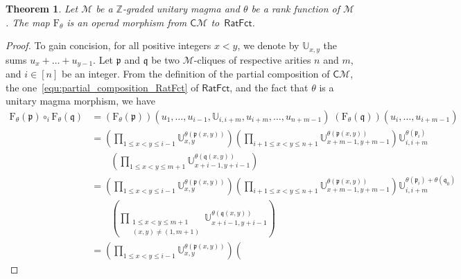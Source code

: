 \documentclass[10pt,reqno]{amsart}
\numberwithin{equation}{subsection}
\renewcommand{\leq}{\leqslant}
\newtheorem{Theorem}{Theorem}[subsection]
\newcommand{\Z}{\mathbb{Z}}
\newcommand{\Mca}{\mathcal{M}}
\newcommand{\Ubb}{\mathbb{U}}
\newcommand{\Pfr}{\mathfrak{p}}
\newcommand{\Qfr}{\mathfrak{q}}
\newcommand{\Cli}{\mathsf{C}}
\newcommand{\RatFct}{\mathsf{RatFct}}
\newcommand{\Frac}{\mathrm{F}}
\begin{document}
\begin{Theorem} \label{thm:rat_fct_cliques}
    Let $\Mca$ be a $\Z$-graded unitary magma and $\theta$ be a rank
    function of $\Mca$. The map $\Frac_\theta$ is an operad morphism
    from $\Cli\Mca$ to~$\RatFct$.
\end{Theorem}
\begin{proof}
    To gain concision, for all positive integers $x < y$, we denote
    by $\Ubb_{x, y}$ the sums $u_x + \dots + u_{y - 1}$. Let $\Pfr$
    and $\Qfr$ be two $\Mca$-cliques of respective arities $n$ and $m$,
    and $i \in [n]$ be an integer. From the definition of the partial
    composition of $\Cli\Mca$, the
    one~\eqref{equ:partial_composition_RatFct} of $\RatFct$, and the
    fact that $\theta$ is a unitary magma morphism, we have
    \begin{equation}\begin{split}
        \Frac_\theta(\Pfr) \circ_i \Frac_\theta(\Qfr)
        & =
        \left(\Frac_\theta(\Pfr)\right)
            \left(u_1, \dots,u_{i - 1}, \Ubb_{i, i + m}, u_{i + m},
            \dots, u_{n + m - 1}\right)
        \;
        \left(\Frac_\theta(\Qfr)\right)
            \left(u_i, \dots, u_{i + m - 1}\right) \\
        & =
        \left(
        \prod_{1 \leq x < y \leq i - 1}
        \Ubb_{x, y}^{\theta(\Pfr(x, y))}
        \right)
        \left(
        \prod_{i + 1 \leq x < y \leq n + 1}
        \Ubb_{x + m - 1, y + m - 1}^{\theta(\Pfr(x, y))}
        \right)
        \Ubb_{i, i + m}^{\theta(\Pfr_i)} \\
        & \qquad
        \left(
        \prod_{1 \leq x < y \leq m + 1}
        \Ubb_{x + i - 1, y + i - 1}^{\theta(\Qfr(x, y))}
        \right) \\
        & =
        \left(
        \prod_{1 \leq x < y \leq i - 1}
        \Ubb_{x, y}^{\theta(\Pfr(x, y))}
        \right)
        \left(
        \prod_{i + 1 \leq x < y \leq n + 1}
        \Ubb_{x + m - 1, y + m - 1}^{\theta(\Pfr(x, y))}
        \right)
        \Ubb_{i, i + m}
            ^{\theta(\Pfr_i) + \theta(\Qfr_0)} \\
        & \qquad
        \left(
        \prod_{\substack{
            1 \leq x < y \leq m + 1 \\
            (x, y) \ne (1, m + 1)
        }}
        \Ubb_{x + i - 1, y + i - 1}^{\theta(\Qfr(x, y))}
        \right) \\
        & =
        \left(
        \prod_{1 \leq x < y \leq i - 1}
        \Ubb_{x, y}^{\theta(\Pfr(x, y))}
        \right)
        \left(

\end{split}
\end{equation}
\end{proof}
\end{document}

